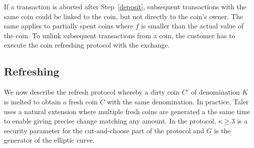\documentclass{llncs}
\begin{document}
If a transaction is aborted after Step~\ref{deposit},
subsequent transactions with the same coin could be linked to the coin,
but not directly to the coin's owner.  The same applies to partially
spent coins where $f$ is smaller than the actual value of the coin.
To unlink subsequent transactions from a coin, the customer has to
execute the coin refreshing protocol with the exchange.

%
%
%


\subsection{Refreshing} \label{sec:refreshing}

We now describe the refresh protocol whereby a dirty coin $C'$ of
denomination $K$ is melted to obtain a fresh coin $\widetilde{C}$
with the same denomination.  In practice, Taler uses a natural
extension where multiple fresh coins are generated a the same time to
enable giving precise change matching any amount.
In the protocol, $\kappa \ge 3$ is a security parameter for the
cut-and-choose part of the protocol and $G$ is the
generator of the elliptic curve.
\end{document}
